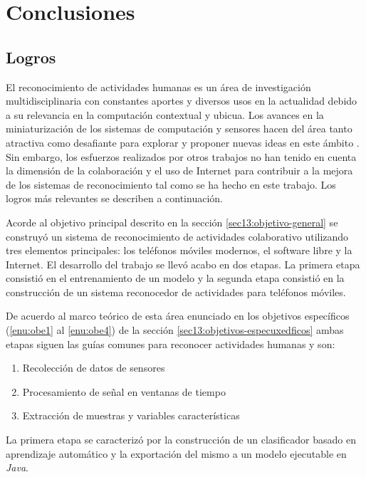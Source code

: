 
\chapter{Conclusiones}

\label{conclusiones-y-trabajos-futuros}

\section{Logros}

\label{conclusiones}

El reconocimiento de actividades humanas es un área de investigación
multidisciplinaria con constantes aportes y diversos usos en la actualidad
debido a su relevancia en la computación contextual y ubicua. Los
avances en la miniaturización de los sistemas de computación y sensores
hacen del área tanto atractiva como desafiante para explorar y proponer
nuevas ideas en este ámbito \cite{LaraLabrador2013}. Sin embargo,
los esfuerzos realizados por otros trabajos no han tenido en cuenta
la dimensión de la colaboración y el uso de Internet para contribuir
a la mejora de los sistemas de reconocimiento tal como se ha hecho
en este trabajo. Los logros más relevantes se describen a continuación.

Acorde al objetivo principal descrito en la sección \ref{sec13:objetivo-general}
se construyó un sistema de reconocimiento de actividades colaborativo
utilizando tres elementos principales: los teléfonos móviles modernos,
el software libre y la Internet. El desarrollo del trabajo se llevó
acabo en dos etapas. La primera etapa consistió en el entrenamiento
de un modelo y la segunda etapa consistió en la construcción de un
sistema reconocedor de actividades para teléfonos móviles.

De acuerdo al marco teórico de esta área enunciado en los objetivos
específicos (\ref{enu:obe1} al \ref{enu:obe4}) de la sección \ref{sec13:objetivos-especuxedficos}
ambas etapas siguen las guías comunes para reconocer actividades humanas
y son:
\begin{enumerate}
\item Recolección de datos de sensores
\item Procesamiento de señal en ventanas de tiempo
\item Extracción de muestras y variables características
\end{enumerate}
La primera etapa se caracterizó por la construcción de un clasificador
basado en aprendizaje automático y la exportación del mismo a un modelo
ejecutable en \emph{Java}.


